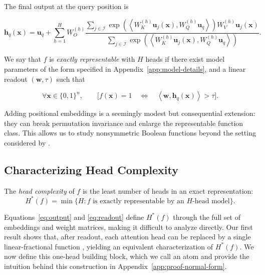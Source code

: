\documentclass{article}
\theoremstyle{definition}
\theoremstyle{plain}
\newcommand{\hstar}{H^{\ast}}
\newcommand{\bits}{\{0,1\}}
\begin{document}
The final output at the query position is

\begin{equation}
\mathbf{h}_q(\mathbf{x})=\mathbf{u}_q+\sum_{h=1}^{H}
W_O^{(h)}
\frac{\sum_{j\in\mathcal{I}}
  \exp\!\left(\left\langle W_K^{(h)}\mathbf{u}_j(\mathbf{x}),W_Q^{(h)}\mathbf{u}_q\right\rangle\right)
  W_V^{(h)}\mathbf{u}_j(\mathbf{x})}
{\sum_{j\in\mathcal{I}}
  \exp\!\left(\left\langle W_K^{(h)}\mathbf{u}_j(\mathbf{x}),W_Q^{(h)}\mathbf{u}_q\right\rangle\right)}.
\label{eq:output}
\end{equation}

We say that $f$ is \emph{exactly representable} with $H$ heads if there exist model parameters of the form specified in Appendix~\ref{app:model-details}, and a linear readout $(\mathbf{w},\tau)$ such that

\begin{equation}
\forall\mathbf{x}\in\bits^n,\qquad
\bigl[f(\mathbf{x})=1 \quad\Longleftrightarrow\quad
\left\langle \mathbf{w},\mathbf{h}_q(\mathbf{x})\right\rangle>\tau\bigr].
\label{eq:readout}
\end{equation}

Adding positional embeddings is a seemingly modest but consequential extension: they can break permutation invariance and enlarge the representable function class. This allows us to study nonsymmetric Boolean functions beyond the setting considered by \citet{hsu2026attentionbased}.

\subsection{Characterizing Head Complexity}
The \emph{head complexity} of $f$ is the least number of heads in an exact representation:
\begin{equation}
\hstar(f)=\min\{H: f\text{ is exactly representable by an }H\text{-head model}\}.
\label{eq:hstar}
\end{equation}

Equations~\ref{eq:output} and \ref{eq:readout} define $\hstar(f)$ through the full set of embeddings and weight matrices, making it difficult to analyze directly. Our first result shows that, after readout, each attention head can be replaced by a single linear-fractional function \citep{charnes1962programming}, yielding an equivalent characterization of $\hstar(f)$. We now define this one-head building block, which we call an atom and provide the intuition behind this construction in Appendix~\ref{app:proof-normal-form}.
\end{document}
